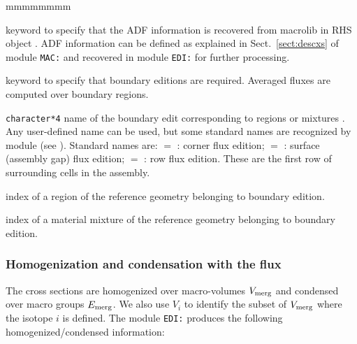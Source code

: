 \begin{ListeDeDescription}{mmmmmmmm}
\item[\moc{ADFM}] keyword to specify that the ADF information is recovered from macrolib in RHS object . ADF information can
be defined as explained in Sect.~\ref{sect:descxs} of module {\tt MAC:} and recovered in module {\tt EDI:} for further processing.

\item[\moc{ADF}] keyword to specify that boundary editions are required. Averaged fluxes are
computed over boundary regions.

\item[\dusa{TYPE}] {\tt character*4} name of the boundary edit corresponding to
regions  or mixtures . Any user-defined name can be used, but some
standard names are recognized by module  (see ). Standard names are: $=$ :
corner flux edition; $=$ : surface (assembly gap) flux edition; $=$ :
row flux edition. These are the first row of surrounding cells in the assembly.

\item[\dusa{ireg}] index of a region of the reference geometry belonging to boundary edition.

\item[\dusa{imix}] index of a material mixture of the reference geometry belonging to boundary edition.

\end{ListeDeDescription}

\subsubsection{Homogenization and condensation with the flux}

The cross sections are homogenized over macro-volumes $V_{\rm merg}$ and condensed over
macro groups $E_{\rm merg}$. We also use $V_i$ to identify the subset of $V_{\rm merg}$ where
the isotope $i$ is defined. The module {\tt EDI:} produces the following homogenized/condensed information:

